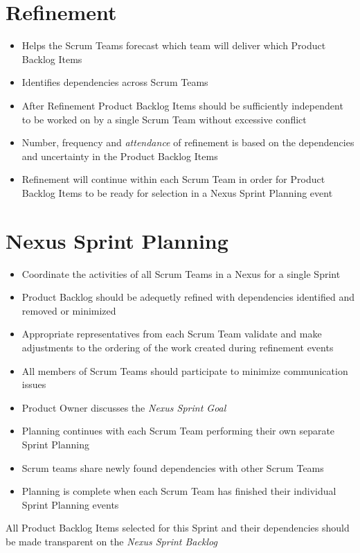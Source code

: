 \documentclass[a4paper,11pt,twocolumn]{article}
\begin{document}
\section*{Refinement}
\begin{itemize}
	\item Helps the Scrum Teams forecast which team will deliver which Product Backlog Items
	\item Identifies dependencies across Scrum Teams
	\item After Refinement Product Backlog Items should be sufficiently independent to be worked on by a single Scrum Team without excessive conflict
	\item Number, frequency and \textit{attendance} of refinement is based on the dependencies and uncertainty in the Product Backlog Items
	\item Refinement will continue within each Scrum Team in order for Product Backlog Items to be ready for selection in a Nexus Sprint Planning event
\end{itemize}

\section*{Nexus Sprint Planning}
\begin{itemize}
	\item Coordinate the activities of all Scrum Teams in a Nexus for a single Sprint
	\item Product Backlog should be adequetly refined with dependencies identified and removed or minimized
	\item Appropriate representatives from each Scrum Team validate and make adjustments to the ordering of the work created during refinement events
	\item All members of Scrum Teams should participate to minimize communication issues
	\item Product Owner discusses the \textit{Nexus Sprint Goal}
	\item Planning continues with each Scrum Team performing their own separate Sprint Planning
	\item Scrum teams share newly found dependencies with other Scrum Teams
	\item Planning is complete when each Scrum Team has finished their individual Sprint Planning events
\end{itemize}

\begin{tcolorbox}[colback=black!8!white,colframe=gray!50!black,title=Note,sharp corners,fonttitle=\normalsize\bfseries,fontupper=\normalsize]
	All Product Backlog Items selected for this Sprint and their dependencies should be made transparent on the \textit{Nexus Sprint Backlog}
\end{tcolorbox}
\end{document}
